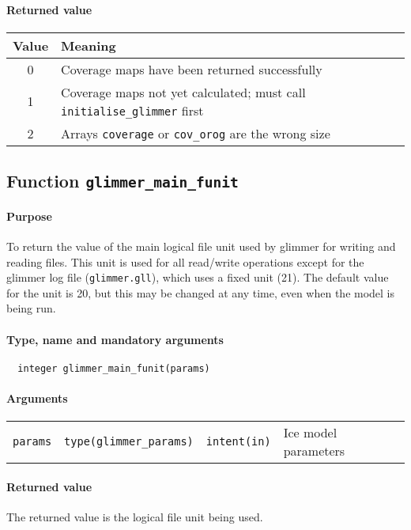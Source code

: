 \documentclass[11pt]{article}
\begin{document}
\paragraph{Returned value}
%
\begin{center}
\begin{tabular}{|c|l|}
\hline
Value & Meaning \\
\hline
\hline
0 & Coverage maps have been returned successfully \\
1 & Coverage maps not yet calculated; must call \texttt{initialise\_glimmer}
first \\
2 & Arrays \texttt{coverage} or \texttt{cov\_orog} are the wrong size \\
\hline
\end{tabular}
\end{center}
%
\subsection{Function \texttt{glimmer\_main\_funit}}
%
\paragraph{Purpose}
%
To return the value of the main logical file unit used by glimmer for writing
and reading files. This unit is used for all read/write operations except for
the glimmer log file (\texttt{glimmer.gll}), which uses a fixed unit (21). The
default value for the unit is 20, but this may be changed at any time, even
when the model is being run.
%
\paragraph{Type, name and mandatory arguments}
%
\begin{verbatim}
  integer glimmer_main_funit(params)
\end{verbatim}
%
\paragraph{Arguments}
%
\begin{center}
\begin{tabular}{llll}
\texttt{params} & \texttt{type(glimmer\_params)} & \texttt{intent(in)} & Ice model parameters \\
\end{tabular}
\end{center}
%
\paragraph{Returned value}
%
The returned value is the logical file unit being used.
%
\end{document}

